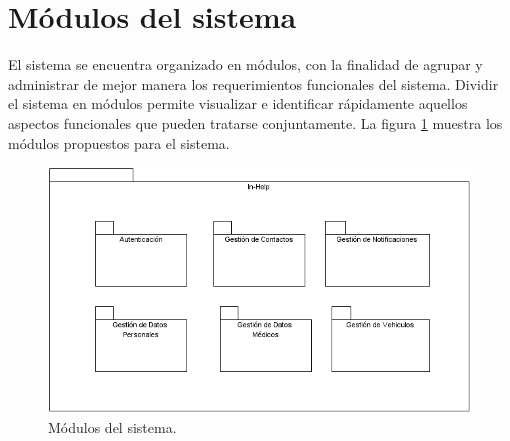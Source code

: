 
\section{Módulos del sistema}

El sistema se encuentra organizado en módulos, con la finalidad de agrupar y administrar de mejor manera los requerimientos funcionales del sistema. Dividir el sistema en módulos permite visualizar e identificar rápidamente aquellos aspectos funcionales que pueden tratarse conjuntamente. La figura \ref{fig:modulos} muestra los módulos propuestos para el sistema.

\begin{figure}[h!]
	\begin{center}
		\includegraphics[scale=0.4]{ModeloComportamiento/imagenes/modulosSistema.png}
		\caption{Módulos del sistema.}
		\label{fig:modulos}
	\end{center}
\end{figure}

%
%	
%		
